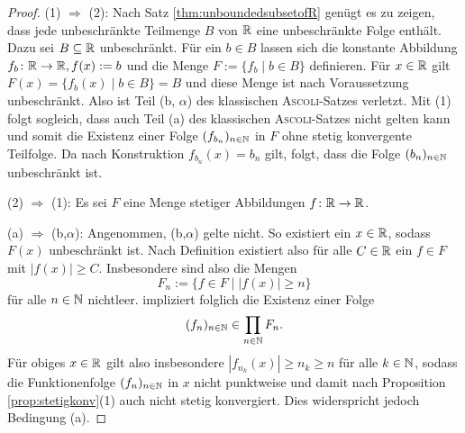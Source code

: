 \begin{proof}
  (1) $\Rightarrow$ (2):
  Nach Satz \ref{thm:unboundedsubsetofR} genügt es zu zeigen, dass jede unbeschränkte Teilmenge $B$ von $\mathbb{R}$ eine unbeschränkte Folge enthält.
  Dazu sei $B \subseteq \mathbb{R}$ unbeschränkt.
  Für ein $b \in B$ lassen sich die konstante Abbildung $f_b \colon \mathbb{R} \to \mathbb{R}, f(x):= b$ und die Menge $F := \{f_b \mid b \in B\}$ definieren.
  Für $x \in \mathbb{R}$ gilt $F(x) = \{f_b(x) \mid b \in B\} = B$ und diese Menge ist nach Voraussetzung unbeschränkt.
  Also ist Teil (b, $\alpha$) des klassischen \textsc{Ascoli}\hyp{}Satzes verletzt.
  Mit (1) folgt sogleich, dass auch Teil (a) des klassischen \textsc{Ascoli}\hyp{}Satzes nicht gelten kann und somit die Existenz einer Folge $(f_{b_n})_{n \in \mathbb{N}}$ in $F$ ohne stetig konvergente Teilfolge.
  Da nach Konstruktion $f_{b_n}(x) = b_n$ gilt,  folgt, dass die Folge $(b_n)_{n \in \mathbb{N}}$ unbeschränkt ist.

  (2) $\Rightarrow$ (1):
  Es sei $F$ eine Menge stetiger Abbildungen $f \colon \mathbb{R} \to \mathbb{R}$.

  (a) $\Rightarrow$ (b,$\alpha$):
  Angenommen, (b,$\alpha$) gelte nicht. So existiert ein $x \in \mathbb{R}$, sodass $F(x)$ unbeschränkt ist.
  Nach Definition existiert also für alle $C \in \mathbb{R}$ ein $f \in F$ mit $|f(x)| \geq C$.
  Insbesondere sind also die Mengen 
  \begin{displaymath}
    F_n := \{ f \in F \mid |f(x)| \geq n \}
  \end{displaymath}
  für alle $n \in \mathbb{N}$ nichtleer.
  \CCR impliziert folglich die Existenz einer Folge 
  \begin{displaymath}
    (f_n)_{n \in \mathbb{N}} \in \prod_{n \in \mathbb{N}} F_n.
  \end{displaymath}
  Für obiges $x \in \mathbb{R}$ gilt also insbesondere $|f_{n_k}(x)| \geq n_k \geq n$ für alle $k \in \mathbb{N}$, sodass die Funktionenfolge $(f_n)_{n \in \mathbb{N}}$ in $x$ nicht punktweise und damit nach Proposition \ref{prop:stetigkonv}(1) auch nicht stetig konvergiert.  
  Dies widerspricht jedoch Bedingung (a).


\end{proof}
